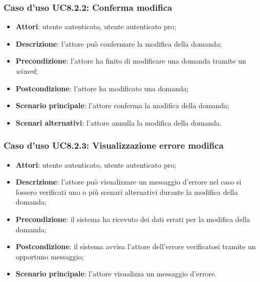 	\subsubsection{Caso d'uso UC8.2.2: Conferma modifica}
	\begin{itemize}
		\item
			\textbf{Attori}: utente autenticato, utente autenticato pro;
		\item
			\textbf{Descrizione}: l'attore può confermare la modifica della domanda;
		\item		
			\textbf{Precondizione}: l'attore ha finito di modificare una domanda tramite un \textit{wizard};
		\item
			\textbf{Postcondizione}: l'attore ha modificato una domanda;
		\item
			\textbf{Scenario principale}: l'attore conferma la modifica della domanda;		
		\item
	 		\textbf{Scenari alternativi}: l'attore annulla la modifica della domanda.
	\end{itemize}		
	\subsubsection{Caso d'uso UC8.2.3: Visualizzazione errore modifica}
	\begin{itemize}
		\item
			\textbf{Attori}: utente autenticato, utente autenticato pro;
		\item
			\textbf{Descrizione}: l'attore può visualizzare un messaggio d'errore nel caso si fossero verificati uno o più scenari alternativi durante la modifica della domanda;
		\item		
			\textbf{Precondizione}: il sistema ha ricevuto dei dati errati per la modifica della domanda;
		\item
			\textbf{Postcondizione}: il sistema avvisa l'attore dell'errore verificatosi tramite un opportuno messaggio;
		\item
			\textbf{Scenario principale}: l'attore visualizza un messaggio d'errore.	
	\end{itemize}	